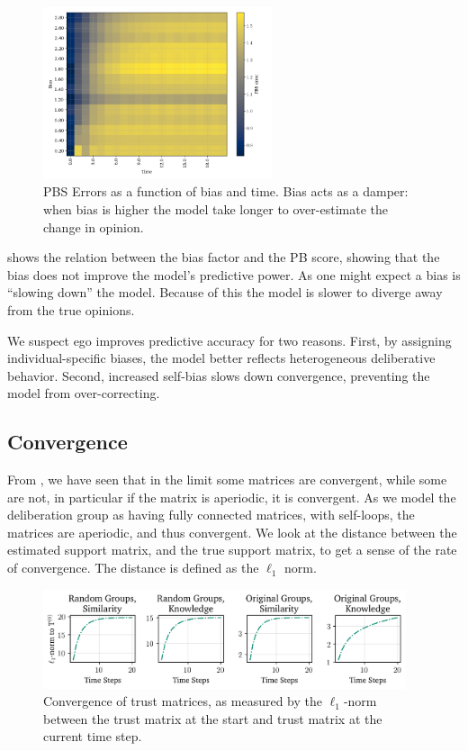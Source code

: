 \begin{figure}[ht]
	\centering

	\includegraphics[width=0.6\textwidth]{Figures/bias_time_imshow.png}
	\hspace{1em}
	\caption{PBS Errors as a function of bias and time. Bias acts as a damper: when bias is higher the model take longer to over-estimate the change in opinion.}
	\label{fig:bias_slowdown}
\end{figure}

 shows the relation between the bias factor and the PB
score, showing that the bias does not improve the model's predictive power. As
one might expect a bias is ``slowing down'' the model. Because of this the
model is slower to diverge away from the true opinions.

We suspect ego improves predictive accuracy for two reasons. First, by
assigning individual-specific biases, the model better reflects heterogeneous
deliberative behavior. Second, increased self-bias slows down convergence,
preventing the model from over-correcting.

\subsection{Convergence}

From , we have seen that in the limit some matrices are
convergent, while some are not, in particular if the matrix is aperiodic, it
is convergent. As we model the deliberation group as having fully connected
matrices, with self-loops, the matrices are aperiodic, and thus convergent. We look at the
distance between the estimated support matrix, and the true support matrix, to
get a sense of the rate of convergence. The distance is defined as the
$\ell_1$ norm.

\begin{figure}[ht]
	\begin{center}
		\includegraphics[width=0.95\textwidth]{Figures/convergence_groups.png}
	\end{center}
	\caption{Convergence of trust matrices, as measured by the $\ell_1$-norm between the trust matrix at the start and  trust matrix at the current time step.}\label{fig:convergence_big}
\end{figure}

